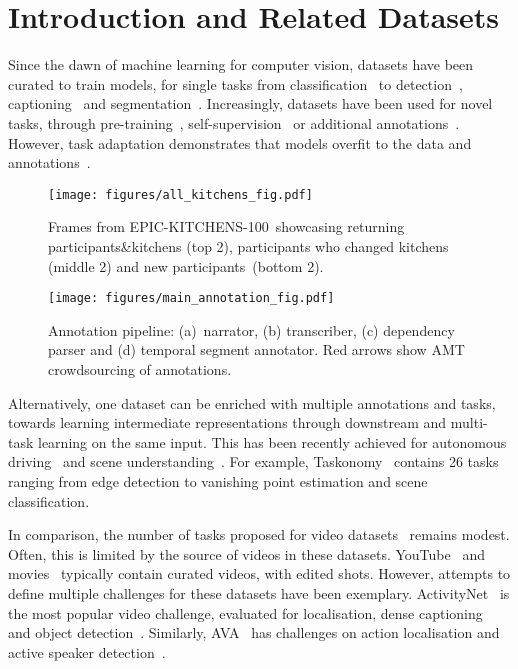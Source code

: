 \RequirePackage{amsmath} \documentclass[runningheads]{llncs}
\newcommand {\newDataset} {EPIC-KITCHENS-100}
\begin{document}
\section{Introduction and Related Datasets}

Since the dawn of machine learning for computer vision, datasets have been curated to train models, for single tasks from classification~\cite{imagenet,carreira2017quo} to detection~\cite{coco,gu2018ava}, captioning~\cite{Karpathy14,xu2016msr} and segmentation~\cite{ade,Perazzi2016}. 
Increasingly, datasets have been used for novel tasks, through pre-training~\cite{he2018rip,Mettes2016shuffle}, self-supervision~\cite{noroozi2016,Vondrick2018tracking} or additional annotations~\cite{gupta2015visual,CabaJHG18}. However, task adaptation demonstrates that models overfit to the data and annotations~\cite{zhai2019largescale,Moltisanti2017}. 



\begin{figure}[t]
    \centering
    \texttt{[image: figures/all\_kitchens\_fig.pdf]}
    \caption{Frames from \newDataset~showcasing returning participants\&kitchens (top 2), participants who changed kitchens (middle 2) and new participants~(bottom 2).}
    \label{fig:kitchen_examples}
\end{figure}

\begin{figure}[htb]
    \centering
    \texttt{[image: figures/main\_annotation\_fig.pdf]}
\caption{Annotation pipeline: (a)~narrator, (b) transcriber, (c) dependency parser and (d) temporal segment annotator. Red arrows show AMT crowdsourcing of annotations.}\label{fig:main_annotation}
\end{figure}

Alternatively, one dataset can be enriched with multiple annotations and tasks, towards learning intermediate representations through downstream and multi-task learning on the same input.  This has been recently achieved for autonomous driving~\cite{zhou2019does,geiger2012we,Cordts2016Cityscapes,neuhold2017mapillary,yu2018bdd100k,huang2018apolloscape,nuscenes2019,yogamani2019woodscape} and scene understanding~\cite{zamir2018taskonomy,silberman2012indoor}.
For example, 
Taskonomy~\cite{zamir2018taskonomy} contains 26 tasks ranging from edge detection to vanishing point estimation and scene classification. 

In comparison, the number of tasks proposed for video datasets~\cite{Damen2018EPICKITCHENS,gu2018ava,caba2015activitynet,rohrbach2015dataset,zhou2017procnets,Rohrbach2012} remains modest.
Often, this is limited by the source of videos in these datasets. YouTube~\cite{caba2015activitynet,zhou2017procnets} and movies~\cite{gu2018ava,rohrbach2015dataset} typically contain curated videos, with edited shots.
However, attempts to define multiple challenges for these datasets have been exemplary. ActivityNet~\cite{caba2015activitynet} is the most popular video challenge, evaluated for localisation, dense captioning~\cite{krishna2017dense} and object detection~\cite{zhou2019grounded}.
Similarly, AVA~\cite{gu2018ava} has  challenges on action localisation and active speaker detection~\cite{roth2019ava}.
\end{document}
